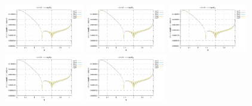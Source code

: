 \noindent
\includegraphics[width=3.5cm]{python_codes/fieldstone_152/RESULTS/exp2/vel_32_m2}
\includegraphics[width=3.5cm]{python_codes/fieldstone_152/RESULTS/exp2/vel_32_m3}
\includegraphics[width=3.5cm]{python_codes/fieldstone_152/RESULTS/exp2/vel_32_m4}
\includegraphics[width=3.5cm]{python_codes/fieldstone_152/RESULTS/exp2/vel_32_m5}
\includegraphics[width=3.5cm]{python_codes/fieldstone_152/RESULTS/exp2/vel_32_m6}

